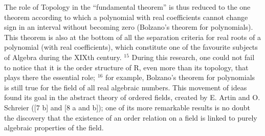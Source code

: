 The role of Topology in the ``fundamental theorem'' is thus reduced to the one theorem according to which a polynomial with real coefficients cannot change sign in an interval without becoming zero (Bolzano's theorem for polynomials). This theorem is also at the bottom of all the separation criteria for real roots of a polynomial (with real coefficients), which constitute one of the favourite subjects of Algebra during the XIXth century. \(^{15}\) During this research, one could not fail to notice that it is the order structure of R, even more than its topology, that plays there the essential role; \(^{16}\) for example, Bolzano's theorem for polynomials is still true for the field of all real algebraic numbers. This movement of ideas found its goal in the abstract theory of ordered fields, created by E. Artin and O. Schreier ({[}7 b{]} and {[}8 a and b{]}); one of its more remarkable results is no doubt the discovery that the existence of an order relation on a field is linked to purely algebraic properties of the field.
